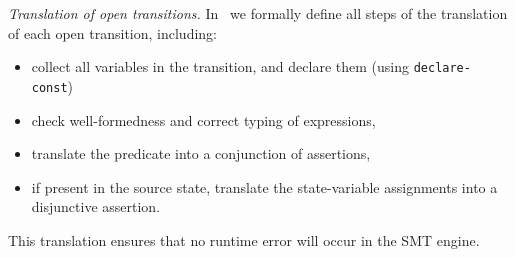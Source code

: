 \documentclass[smallcondensed]{svjour3}
\newcommand{\TODO}[1]{\textcolor{red}{\textbf{[TODO:#1]}}}
\newcommand{\Post}{\symb{Post}}
\begin{document}



\emph{Translation of open transitions.}
In~\cite{Avocs-RR} we formally define all steps of the translation of each
open transition, including:
%
\begin{itemize}
\item collect all variables in the transition, and declare them (using \texttt{declare-const})
\item check well-formedness and correct typing of expressions,
\item translate the predicate into a conjunction of assertions,
\item if present in the source state, translate the state-variable
  assignments into a disjunctive assertion.
\end{itemize}
%
This translation ensures that no runtime error will occur
in the SMT engine.
\end{document}
